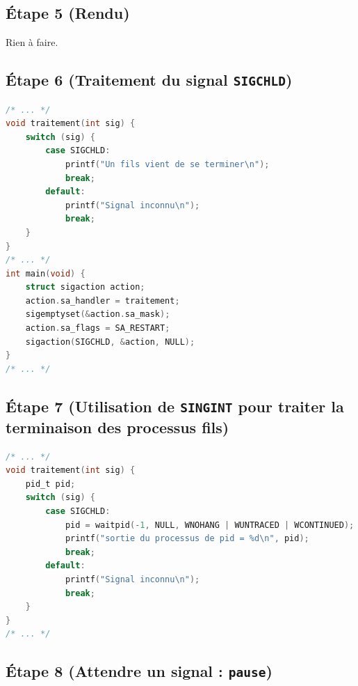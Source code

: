 \documentclass{article}
\begin{document}
\subsection*{Étape 5 (Rendu)}

Rien à faire.

\subsection*{Étape 6 (Traitement du signal \texttt{SIGCHLD})}

\begin{lstlisting}[language=C, caption=ajout de la question 6]
/* ... */
void traitement(int sig) {
    switch (sig) {
        case SIGCHLD:
            printf("Un fils vient de se terminer\n");
            break;
        default:
            printf("Signal inconnu\n");
            break;
    }
}
/* ... */
int main(void) {
    struct sigaction action;
    action.sa_handler = traitement;
    sigemptyset(&action.sa_mask);
    action.sa_flags = SA_RESTART;
    sigaction(SIGCHLD, &action, NULL);
}
/* ... */
\end{lstlisting}

\subsection*{Étape 7 (Utilisation de \texttt{SINGINT} pour traiter la terminaison des processus fils)}

\begin{lstlisting}[language=C, caption=ajout de la question 7]
/* ... */
void traitement(int sig) {
    pid_t pid;
    switch (sig) {
        case SIGCHLD:
            pid = waitpid(-1, NULL, WNOHANG | WUNTRACED | WCONTINUED);
            printf("sortie du processus de pid = %d\n", pid);
            break;
        default:
            printf("Signal inconnu\n");
            break;
    }
}
/* ... */
\end{lstlisting}

\subsection*{Étape 8 (Attendre un signal : \texttt{pause})}
\end{document}
